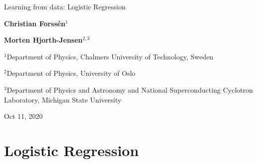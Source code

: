 \documentclass[%
oneside,                 %
final,                   %
10pt]{article}
\begin{document}

\newcommand{\exercisesection}[1]{\subsection*{#1}}







\thispagestyle{empty}

\begin{center}
{\LARGE\bf
\begin{spacing}{1.25}
Learning from data: Logistic Regression
\end{spacing}
}
\end{center}


\begin{center}
{\bf Christian Forssén${}^{1}$} \\ [0mm]
\end{center}


\begin{center}
{\bf Morten Hjorth-Jensen${}^{2, 3}$} \\ [0mm]
\end{center}

\begin{center}
\centerline{{\small ${}^1$Department of Physics, Chalmers University of Technology, Sweden}}
\centerline{{\small ${}^2$Department of Physics, University of Oslo}}
\centerline{{\small ${}^3$Department of Physics and Astronomy and National Superconducting Cyclotron Laboratory, Michigan State University}}
\end{center}
    

\begin{center}
Oct 11, 2020
\end{center}

\vspace{1cm}


\section{Logistic Regression}
\end{document}
